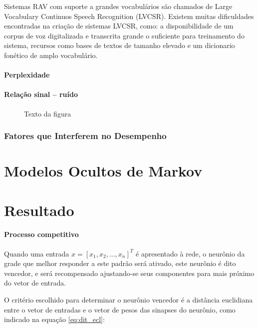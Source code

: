 Sistemas RAV com suporte a grandes vocabulários são chamados de Large Vocabulary Continuos Speech Recognition (LVCSR). Existem muitas dificuldades encontradas na criação de sistemas LVCSR, como: a disponibilidade de um corpus de voz digitalizada e transcrita grande o suficiente para treinamento do sistema, recursos como bases de textos de
tamanho elevado e um dicionario fonético de amplo vocabulário.\cite{RvPatrick}
\subsubsection{Perplexidade} 

\subsubsection{Relação sinal – ruído}

\begin{figure}[H]
\centering

\caption{Texto da figura}
\end{figure}

\subsection{Fatores que Interferem no Desempenho}

\chapter{Modelos Ocultos de Markov}

\chapter{Resultado}

\subsubsection{Processo competitivo}

Quando uma entrada $ x = \left[x_1, x_2, ..., x_n\right]^T $ é apresentado à
rede, o neurônio da grade que melhor responder a este padrão será ativado, este
neurônio é dito vencedor, e será recompensado ajustando-se seus componentes
para mais próximo do vetor de entrada.

O critério escolhido para determinar o neurônio vencedor é a distância
euclidiana entre o vetor de entradas e o vetor de pesos das sinapses do
neurônio, como indicado na equação \ref{eq:dit_ecl}:


